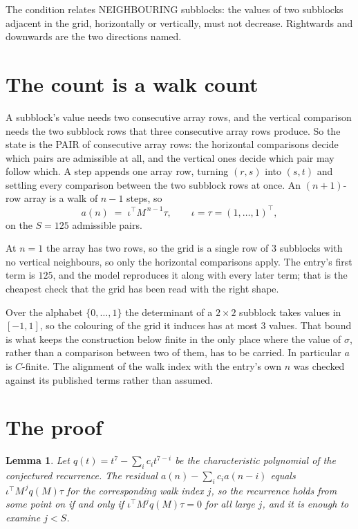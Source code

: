 \documentclass[11pt,a4paper]{article}
\theoremstyle{plain}
\newtheorem{lemma}[theorem]{Lemma}
\theoremstyle{definition}
\begin{document}
The condition relates NEIGHBOURING subblocks: the values of two subblocks adjacent in the grid,
horizontally or vertically, must not decrease. Rightwards and downwards are the two directions named.

\section{The count is a walk count}

A subblock's value needs two consecutive array rows, and the vertical
comparison needs the two subblock rows that three consecutive array rows produce. So the state
is the PAIR of consecutive array rows: the horizontal comparisons decide which pairs are
admissible at all, and the vertical ones decide which pair may follow which. A step appends one
array row, turning $(r,s)$ into $(s,t)$ and settling every comparison between the two subblock
rows at once. An $(n+1)$-row array is a walk of $n-1$ steps, so
\[
a(n)\;=\;\iota^{\!\top}M^{\,n-1}\tau,\qquad\iota=\tau=(1,\dots,1)^{\!\top},
\]
on the $S=125$ admissible pairs.

At $n=1$ the array has two rows, so the grid is a single row of $3$
subblocks with no vertical neighbours, so only the horizontal comparisons apply. The
entry's first term is $125$, and the model reproduces it along with every later term; that
is the cheapest check that the grid has been read with the right shape.

Over the alphabet $\{0,\dots,1\}$ the determinant of a $2\times2$ subblock takes values in
$[-1,1]$, so the colouring of the grid it induces has at most $3$ values.
That bound is what keeps the construction below finite in the only place where the value of
$\sigma$, rather than a comparison between two of them, has to be carried.
In particular $a$ is $C$-finite. The alignment of the walk index with the entry's own $n$ was
checked against its published terms rather than assumed.

\section{The proof}

\begin{lemma}\label{lem:crit}
Let $q(t)=t^{7}-\sum_i c_it^{7-i}$ be the characteristic polynomial of the
conjectured recurrence. The residual $a(n)-\sum_ic_ia(n-i)$ equals
$\iota^{\!\top}M^{\,j}q(M)\tau$ for the corresponding walk index $j$, so the recurrence
holds from some point on if and only if $\iota^{\!\top}M^{j}q(M)\tau=0$ for all large $j$,
and it is enough to examine $j<S$.
\end{lemma}
\end{document}

